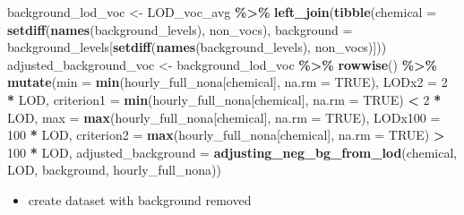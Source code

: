 \documentclass[
]{article}
\newenvironment{Shaded}{\begin{snugshade}}{\end{snugshade}}
\newcommand{\AttributeTok}[1]{\textcolor[rgb]{0.13,0.29,0.53}{#1}}
\newcommand{\ConstantTok}[1]{\textcolor[rgb]{0.56,0.35,0.01}{#1}}
\newcommand{\DecValTok}[1]{\textcolor[rgb]{0.00,0.00,0.81}{#1}}
\newcommand{\FunctionTok}[1]{\textcolor[rgb]{0.13,0.29,0.53}{\textbf{#1}}}
\newcommand{\NormalTok}[1]{#1}
\newcommand{\OtherTok}[1]{\textcolor[rgb]{0.56,0.35,0.01}{#1}}
\newcommand{\SpecialCharTok}[1]{\textcolor[rgb]{0.81,0.36,0.00}{\textbf{#1}}}
\providecommand{\tightlist}{%
  \setlength{\itemsep}{0pt}\setlength{\parskip}{0pt}}
\begin{document}
\begin{Shaded}
\begin{Highlighting}[]
\NormalTok{background\_lod\_voc }\OtherTok{\textless{}{-}}\NormalTok{ LOD\_voc\_avg }\SpecialCharTok{\%\textgreater{}\%}
  \FunctionTok{left\_join}\NormalTok{(}\FunctionTok{tibble}\NormalTok{(}\AttributeTok{chemical =} \FunctionTok{setdiff}\NormalTok{(}\FunctionTok{names}\NormalTok{(background\_levels), non\_vocs),}
                   \AttributeTok{background =}\NormalTok{ background\_levels[}\FunctionTok{setdiff}\NormalTok{(}\FunctionTok{names}\NormalTok{(background\_levels), }
\NormalTok{                                                          non\_vocs)]))}
\NormalTok{adjusted\_background\_voc }\OtherTok{\textless{}{-}}\NormalTok{ background\_lod\_voc }\SpecialCharTok{\%\textgreater{}\%}
  \FunctionTok{rowwise}\NormalTok{() }\SpecialCharTok{\%\textgreater{}\%}
  \FunctionTok{mutate}\NormalTok{(}\AttributeTok{min =} \FunctionTok{min}\NormalTok{(hourly\_full\_nona[chemical], }\AttributeTok{na.rm =} \ConstantTok{TRUE}\NormalTok{),}
         \AttributeTok{LODx2 =} \DecValTok{2} \SpecialCharTok{*}\NormalTok{ LOD,}
         \AttributeTok{criterion1 =} \FunctionTok{min}\NormalTok{(hourly\_full\_nona[chemical], }\AttributeTok{na.rm =} \ConstantTok{TRUE}\NormalTok{) }\SpecialCharTok{\textless{}} \DecValTok{2} \SpecialCharTok{*}\NormalTok{ LOD,}
         \AttributeTok{max =} \FunctionTok{max}\NormalTok{(hourly\_full\_nona[chemical], }\AttributeTok{na.rm =} \ConstantTok{TRUE}\NormalTok{),}
         \AttributeTok{LODx100 =} \DecValTok{100} \SpecialCharTok{*}\NormalTok{ LOD,}
         \AttributeTok{criterion2 =} \FunctionTok{max}\NormalTok{(hourly\_full\_nona[chemical], }\AttributeTok{na.rm =} \ConstantTok{TRUE}\NormalTok{) }\SpecialCharTok{\textgreater{}} \DecValTok{100} \SpecialCharTok{*}\NormalTok{ LOD,}
         \AttributeTok{adjusted\_background =} \FunctionTok{adjusting\_neg\_bg\_from\_lod}\NormalTok{(chemical, LOD, background, }
\NormalTok{                                                         hourly\_full\_nona))}
\end{Highlighting}
\end{Shaded}

\begin{itemize}
\tightlist
\item
  create dataset with background removed
\end{itemize}
\end{document}
